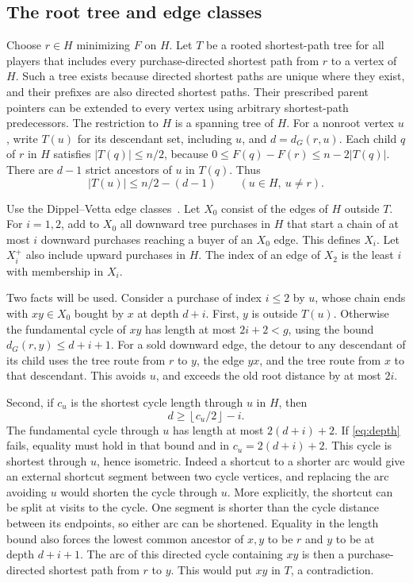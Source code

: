 \documentclass[11pt]{article}
\newcommand{\dG}{d_G}
\newcommand{\floor}[1]{\left\lfloor#1\right\rfloor}
\newcommand{\abs}[1]{\left|#1\right|}
\begin{document}
\subsection{The root tree and edge classes}

Choose \(r\in H\) minimizing \(F\) on \(H\). Let \(T\) be a rooted
shortest-path tree for all players that includes every
purchase-directed shortest path from \(r\) to a vertex of \(H\).
Such a tree exists because directed shortest paths are unique
where they exist, and their prefixes are also directed shortest
paths. Their prescribed parent pointers can be extended to every
vertex using arbitrary shortest-path predecessors. The restriction
to \(H\) is a spanning tree of \(H\). For a nonroot vertex \(u\),
write \(T(u)\) for its descendant set, including \(u\), and
\(d=\dG(r,u)\). Each child \(q\) of \(r\) in \(H\) satisfies
\(\abs{T(q)}\le n/2\), because
\(0\le F(q)-F(r)\le n-2\abs{T(q)}\).
There are \(d-1\) strict ancestors of \(u\) in \(T(q)\).
Thus
\[
 \abs{T(u)}\le n/2-(d-1) \qquad (u\in H,\ u\ne r).
 \tag{4}\label{eq:half}
\]

Use the Dippel--Vetta edge classes~\cite[Lemmas 7--8]{dippel}.
Let \(X_0\) consist of the edges of \(H\) outside \(T\).
For \(i=1,2\), add to \(X_0\) all downward tree purchases in \(H\)
that start a chain of at most \(i\) downward purchases reaching a
buyer of an \(X_0\) edge. This defines \(X_i\).
Let \(X_i^+\) also include upward purchases in \(H\).
The index of an edge of \(X_2\) is the least \(i\) with membership
in \(X_i\).

Two facts will be used. Consider a purchase of index \(i\le2\)
by \(u\), whose chain ends with \(xy\in X_0\) bought by \(x\)
at depth \(d+i\). First, \(y\) is outside \(T(u)\). Otherwise
the fundamental cycle of \(xy\) has length at most \(2i+2<g\),
using the bound \(\dG(r,y)\le d+i+1\). For a sold downward edge,
the detour to any descendant of its child uses the tree route
from \(r\) to \(y\), the edge \(yx\), and the tree route from \(x\)
to that descendant. This avoids \(u\), and exceeds the old root
distance by at most \(2i\).

Second, if \(c_u\) is the shortest cycle length through \(u\)
in \(H\), then
\[
 d\ge\floor{c_u/2}-i.
 \tag{5}\label{eq:depth}
\]
The fundamental cycle through \(u\) has length at most \(2(d+i)+2\).
If \eqref{eq:depth} fails, equality must hold in that bound
and in \(c_u=2(d+i)+2\). This cycle is shortest through \(u\),
hence isometric. Indeed a shortcut to a shorter arc would
give an external shortcut segment between two cycle vertices,
and replacing the arc avoiding \(u\) would shorten the cycle
through \(u\). More explicitly, the shortcut can be split at
visits to the cycle. One segment is shorter than the cycle
distance between its endpoints, so either arc can be shortened.
Equality in the length bound also forces the lowest common
ancestor of \(x,y\) to be \(r\) and \(y\) to be at depth \(d+i+1\).
The arc of this directed cycle containing \(xy\) is then
a purchase-directed shortest path from \(r\) to \(y\).
This would put \(xy\) in \(T\), a contradiction.
\end{document}
